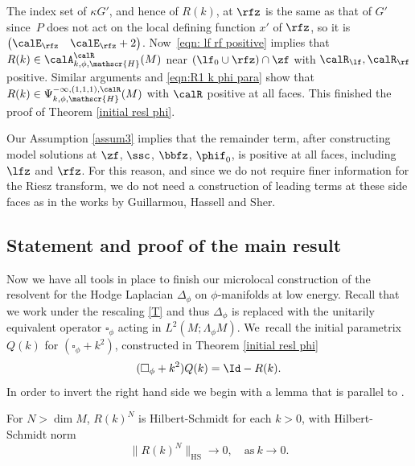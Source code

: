 The index set of $\kappa G'$, and hence of $R(k)$, at $\rfz$ is the same as that of $G'$ since~$P$ does not act on the local defining function $x'$ of $\rfz$, so it is $
\begin{pmatrix}
\calE_\rfz & \calE_\rfz+2
\end{pmatrix}
$.
Now~\eqref{eqn: lf rf positive} implies that $R(k)\in\calA^{\calR}_{k,\phi,\mathscr{H}}(M)$ near $(\lf_0\cup\rfz)\cap\zf$ with $\calR_\lf,\calR_\rf$ positive. Similar arguments and \eqref{eqn:R1 k phi para} show that
$R(k)\in\Psi^{-\infty,(1,1,1),\calR}_{k,\phi,\mathscr{H}}(M)$ with $\calR$ positive at all faces.
This finished the proof of Theorem \ref{initial resl phi}.

\begin{Rem}
Our Assumption \ref{assum3} implies that the remainder term, after constructing model solutions at $\zf$, $\ssc$, $\bbfz$, $\phif_0$, is positive at all faces, including $\lfz$ and $\rfz$. For this reason, and since we do not require finer information for the Riesz transform, we do not need a construction of leading terms at these side faces as in the works by
Guillarmou, Hassell and Sher.
\end{Rem}

\subsection{Statement and proof of the main result} \label{section 9}
Now we have all tools in place to finish our microlocal construction of the resolvent
for the Hodge Laplacian $\Delta_{\phi}$ on $\phi$\nobreakdash-manifolds
at low energy. Recall that we work under the rescaling \eqref{T} and thus $\Delta_{\phi}$
is replaced with the unitarily equivalent operator $\square_{\phi}$ acting in $L^2(M;\Lambda_\phi M)$.
We~recall the initial parametrix $Q(k)$ for $(\square_{\phi} + k^{2})$,
constructed in Theorem \ref{initial resl phi}\vspace*{-3pt}
\[
(\square_{\phi} + k^{2}) Q(k) = \Id - R(k).
\]
In order to invert the right hand side we begin with a lemma that is parallel to
\cite[Cor.\,2.11]{guillarmou2008resolvent}.

\begin{Lemma} \label{hilbert}
For $N > \dim M$, $R(k)^{N}$ is Hilbert-Schmidt for
each $k > 0$, with Hilbert-Schmidt norm\vspace*{-3pt}\enlargethispage{\baselineskip}%
\begin{equation*}
\lVert R(k)^{N} \rVert_{\text{HS}} \to 0,
\quad \text{as} \ k \to 0.
\end{equation*}
\end{Lemma}

